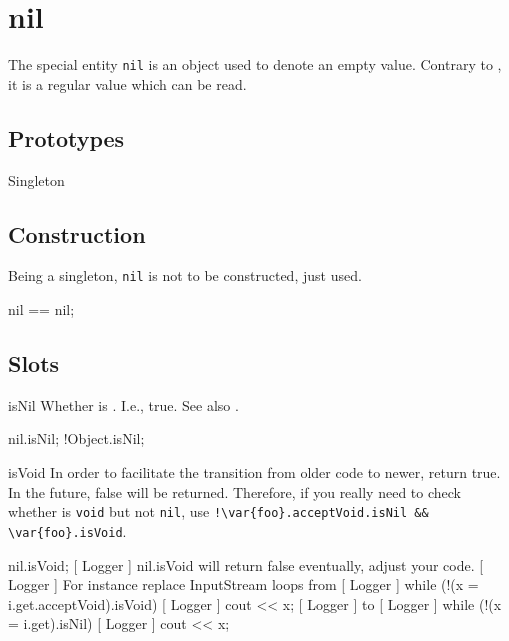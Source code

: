 
\section{nil}

The special entity \lstinline|nil| is an object used to denote an
empty value.  Contrary to , it is a regular value
which can be read.

\subsection{Prototypes}

\begin{refObjects}
\item[Singleton]
\end{refObjects}

\subsection{Construction}

Being a singleton, \lstinline|nil| is not to be constructed, just used.

\begin{urbiassert}[firstnumber=1]
nil == nil;
\end{urbiassert}

\subsection{Slots}

\begin{urbiscriptapi}
\item[isNil] Whether \this is .  I.e., true.  See also
  .
\begin{urbiassert}
nil.isNil;
!Object.isNil;
\end{urbiassert}


\item[isVoid] In order to facilitate the transition from older code to
  newer, return true.  In the future, false will be returned.  Therefore, if
  you really need to check whether  is \lstinline|void| but not
  \lstinline|nil|, use
  \lstinline|!\var{foo}.acceptVoid.isNil && \var{foo}.isVoid|.
\begin{urbiassert}
nil.isVoid;
[     Logger     ] nil.isVoid will return false eventually, adjust your code.
[     Logger     ]     For instance replace InputStream loops from
[     Logger     ]       while (!(x = i.get.acceptVoid).isVoid)
[     Logger     ]         cout << x;
[     Logger     ]     to
[     Logger     ]       while (!(x = i.get).isNil)
[     Logger     ]         cout << x;
\end{urbiassert}
\end{urbiscriptapi}

